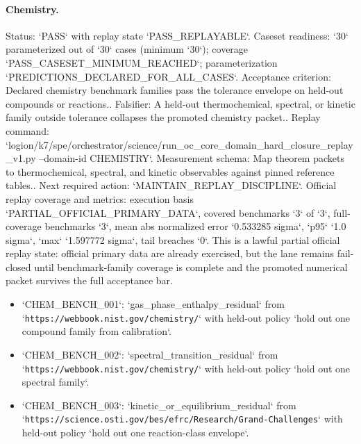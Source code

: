 \paragraph{Chemistry.}
Status: `PASS` with replay state `PASS\_REPLAYABLE`.
Caseset readiness: `30` parameterized out of `30` cases (minimum `30`); coverage `PASS\_CASESET\_MINIMUM\_REACHED`; parameterization `PREDICTIONS\_DECLARED\_FOR\_ALL\_CASES`.
Acceptance criterion: Declared chemistry benchmark families pass the tolerance envelope on held-out compounds or reactions..
Falsifier: A held-out thermochemical, spectral, or kinetic family outside tolerance collapses the promoted chemistry packet..
Replay command: `logion/k7/spe/orchestrator/science/run\_oc\_core\_domain\_hard\_closure\_replay\_v1.py --domain-id CHEMISTRY`.
Measurement schema: Map theorem packets to thermochemical, spectral, and kinetic observables against pinned reference tables..
Next required action: `MAINTAIN\_REPLAY\_DISCIPLINE`.
Official replay coverage and metrics: execution basis `PARTIAL\_OFFICIAL\_PRIMARY\_DATA`, covered benchmarks `3` of `3`, full-coverage benchmarks `3`, mean abs normalized error `0.533285 sigma`, `p95` `1.0 sigma`, `max` `1.597772 sigma`, tail breaches `0`.
This is a lawful partial official replay state: official primary data are already exercised, but the lane remains fail-closed until benchmark-family coverage is complete and the promoted numerical packet survives the full acceptance bar.
\begin{itemize}
\item `CHEM\_BENCH\_001`: `gas\_phase\_enthalpy\_residual` from `\texttt{https://webbook.nist.gov/chemistry/}` with held-out policy `hold out one compound family from calibration`.
\item `CHEM\_BENCH\_002`: `spectral\_transition\_residual` from `\texttt{https://webbook.nist.gov/chemistry/}` with held-out policy `hold out one spectral family`.
\item `CHEM\_BENCH\_003`: `kinetic\_or\_equilibrium\_residual` from `\texttt{https://science.osti.gov/bes/efrc/Research/Grand-Challenges}` with held-out policy `hold out one reaction-class envelope`.
\end{itemize}

